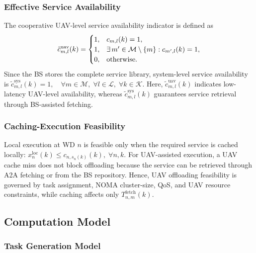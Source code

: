 \documentclass[journal]{IEEEtran}
\begin{document}
\subsubsection{Effective Service Availability}

The cooperative UAV-level service availability indicator is defined as
\begin{equation}
\small
    \tilde{c}_{m,l}^{\mathrm{uav}}(k)=
    \begin{cases}
        1, & c_{m,l}(k)=1,\\
        1, & \exists\, m'\in\mathcal{M}\setminus\{m\}: c_{m',l}(k)=1,\\
        0, & \text{otherwise}.
    \end{cases}
    \label{eq:effective_uav_cache}
\end{equation}
Since the BS stores the complete service library, system-level service availability is $\tilde{c}_{m,l}^{\mathrm{sys}}(k)=1,
    \quad \forall m\in\mathcal{M},\;\forall l\in\mathcal{L},\;
    \forall k\in\mathcal{K}.
    \label{eq:effective_sys_cache}$
Here, $\tilde{c}_{m,l}^{\mathrm{uav}}(k)$ indicates low-latency UAV-level availability, whereas $\tilde{c}_{m,l}^{\mathrm{sys}}(k)$ guarantees service retrieval through BS-assisted fetching.

\subsubsection{Caching-Execution Feasibility}

Local execution at WD $n$ is feasible only when the required service is cached locally:
$x_n^{\mathrm{loc}}(k)\leq c_{n,s_n(k)}(k),\;\forall n,k. \label{local}$
For UAV-assisted execution, a UAV cache miss does not block offloading because the service can be retrieved through A2A fetching or from the BS repository. Hence, UAV offloading feasibility is governed by task assignment, NOMA cluster-size, QoS, and UAV resource constraints, while caching affects only $T_{n,m}^{\mathrm{fetch}}(k)$.


\subsection{Computation Model}
\label{sec:computation_model}

\subsubsection{Task Generation Model}
\end{document}
